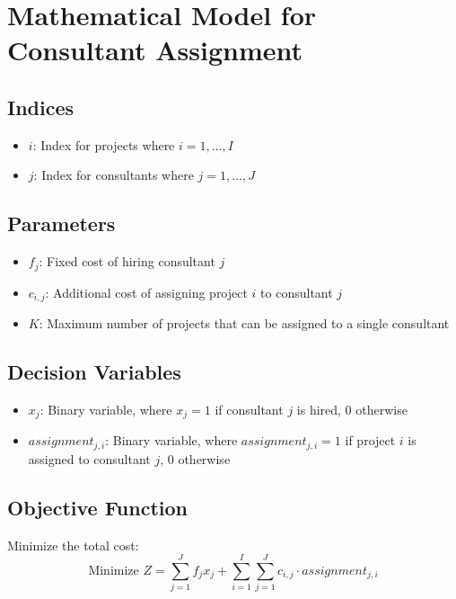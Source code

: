 \documentclass{article}
\begin{document}
\section*{Mathematical Model for Consultant Assignment}

\subsection*{Indices}
\begin{itemize}
    \item \( i \): Index for projects where \( i = 1, \ldots, I \)
    \item \( j \): Index for consultants where \( j = 1, \ldots, J \)
\end{itemize}

\subsection*{Parameters}
\begin{itemize}
    \item \( f_j \): Fixed cost of hiring consultant \( j \)
    \item \( c_{i,j} \): Additional cost of assigning project \( i \) to consultant \( j \)
    \item \( K \): Maximum number of projects that can be assigned to a single consultant
\end{itemize}

\subsection*{Decision Variables}
\begin{itemize}
    \item \( x_{j} \): Binary variable, where \( x_{j} = 1 \) if consultant \( j \) is hired, \( 0 \) otherwise
    \item \( assignment_{j,i} \): Binary variable, where \( assignment_{j,i} = 1 \) if project \( i \) is assigned to consultant \( j \), \( 0 \) otherwise
\end{itemize}

\subsection*{Objective Function}
Minimize the total cost:
\[
\text{Minimize } Z = \sum_{j=1}^{J} f_{j} x_{j} + \sum_{i=1}^{I} \sum_{j=1}^{J} c_{i,j} \cdot assignment_{j,i}
\]
\end{document}
